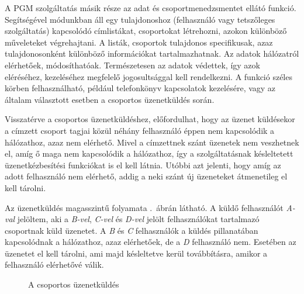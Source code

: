A PGM szolgáltatás másik része az adat és csoportmenedzsmentet ellátó funkció. Segítségével módunkban áll egy tulajdonoshoz (felhasználó vagy tetszőleges szolgáltatás) kapcsolódó címlistákat, csoportokat létrehozni, azokon különböző műveleteket végrehajtani. A listák, csoportok tulajdonos specifikusak, azaz tulajdonosonként különböző információkat tartalmazhatnak. Az adatok hálózatról elérhetőek, módosíthatóak. Természetesen az adatok védettek, így azok eléréséhez, kezeléséhez megfelelő jogosultsággal kell rendelkezni. A funkció széles körben felhasználható, például telefonkönyv kapcsolatok kezelésére, vagy az általam választott esetben a csoportos üzenetküldés során. 

Visszatérve a csoportos üzenetküldéshez, előfordulhat, hogy az üzenet küldésekor a címzett csoport tagjai közül néhány felhasználó éppen nem kapcsolódik a hálózathoz, azaz nem elérhető. Mivel a címzettnek szánt üzenetek nem veszhetnek el, amíg ő maga nem kapcsolódik a hálózathoz, így a szolgáltatásnak késleltetett üzenetkézbesítési funkciókat is el kell látnia. Utóbbi azt jelenti, hogy amíg az adott felhasználó nem elérhető, addig a neki szánt új üzeneteket átmenetileg el kell tárolni.

Az üzenetküldés magasszintű folyamata .~ábrán látható. A küldő felhasználót \emph{A-val} jelöltem, aki a \emph{B-vel}, \emph{C-vel} és \emph{D-vel} jelölt felhasználókat tartalmazó csoportnak küld üzenetet. A \emph{B} és \emph{C} felhasználók a küldés pillanatában kapcsolódnak a hálózathoz, azaz elérhetőek, de a \emph{D} felhasználó nem. Esetében az üzenetet el kell tárolni, ami majd késleltetve kerül továbbításra, amikor a felhasználó elérhetővé válik.

\begin{figure}[htbp]
\center
{}
\caption{A csoportos üzenetküldés}
\label{fig:group_messaging}
\end{figure}

